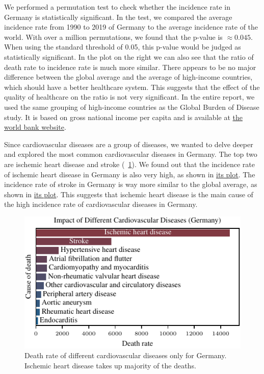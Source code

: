 We performed a permutation test to check whether the incidence rate in Germany is statistically significant. In the test, we compared the average incidence rate from 1990 to 2019 of Germany to the average incidence rate of the world. With over a million permutations, we found that the p-value is $\approx 0.045$. When using the standard threshold of 0.05, this p-value would be judged as statistically significant.
In the plot on the right we can also see that the ratio of death rate to incidence rate is much more similar. There appears to be no major difference between the global average and the average of 
high-income countries, which should have a better healthcare system. This suggests that the effect of the quality of healthcare on the ratio is not very significant. In the entire report, we used the same grouping of high-income countries
as the Global Burden of Disease study. It is based on gross national income per capita and is available at \href{https://datahelpdesk.worldbank.org/knowledgebase/articles/906519-world-bank-country-and-lending-groups}{the world bank website}. 

Since cardiovascular diseases are a group of diseases, we wanted to delve deeper and explored the most common cardiovascular diseases in Germany. The top two are ischemic heart disease and stroke (\figurename~\ref{Impact of Different CVDs}). 
We found out that the incidence rate of ischemic heart disease in Germany is also very high, as shown in \href{https://github.com/sykoravojtech/IHD_germany_2024/blob/main/doc/IHD_germany_2024/fig/fig_ischemic_rate.pdf}{its plot}.
The incidence rate of stroke in Germany is way more similar to the global average, as shown in \href{https://github.com/sykoravojtech/IHD_germany_2024/blob/main/doc/IHD_germany_2024/fig/fig_stroke_rate.pdf}{its plot}. This suggests that ischemic heart disease is the main cause of the high incidence rate of cardiovascular diseases in Germany.

\begin{figure}[ht]
    \vskip 0.2in
    \begin{center}
    \centerline{\includegraphics[width=\columnwidth]{fig/fig_ImpactOfDifferentCVDs.pdf}}
    \caption{Death rate of different cardiovascular diseases only for Germany. Ischemic heart disease takes up majority of the deaths.}
    \label{Impact of Different CVDs}
    \end{center}
    \vskip -0.2in
\end{figure}

